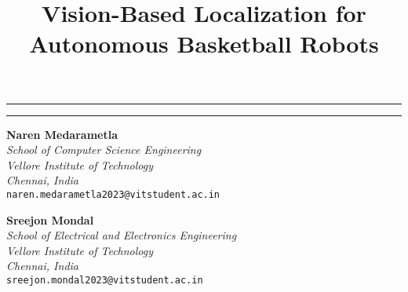 \documentclass[a4paper]{article}
\title{Vision-Based Localization for Autonomous Basketball Robots}
\makeatletter
\renewcommand{\maketitle}{
  \begin{center}
    \noindent\rule{\textwidth}{1pt}\par
    \vspace{0.3em}
    {\LARGE \bfseries \@title \par}
    \vspace{0.3em}
    \noindent\rule{\textwidth}{1pt}\par
  \end{center}
}
\makeatother
\begin{document}
\maketitle
\vspace{1cm}


\begin{multicols}{2}
    \centering
    \textbf{Naren Medarametla}\\
    \textit{School of Computer Science Engineering}\\
    \textit{Vellore Institute of Technology}\\
    \textit{Chennai, India}\\
    \texttt{naren.medarametla2023@vitstudent.ac.in}
    \vfill\null

    \columnbreak

    \textbf{Sreejon Mondal}\\
    \textit{School of Electrical and Electronics Engineering}\\
    \textit{Vellore Institute of Technology}\\
    \textit{Chennai, India}\\
    \texttt{sreejon.mondal2023@vitstudent.ac.in}
    \vfill\null
\end{multicols}
\end{document}
